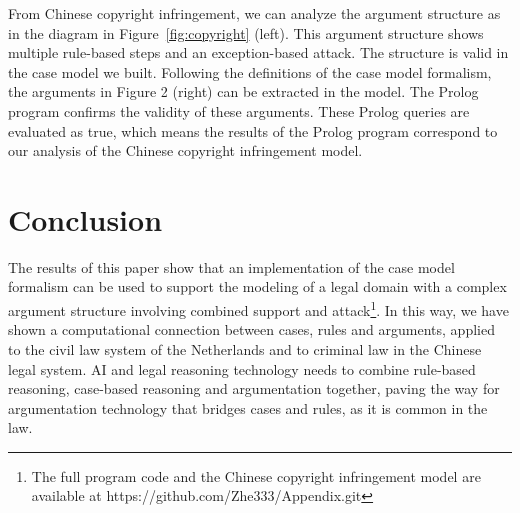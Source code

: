 \documentclass{IOS-Book-Article}
\begin{document}
\begin{figure*}[t]
	\scalebox{0.6}{}
\caption{The Chinese copyright infringement model: argument structure (left); in Prolog (right)}
\label{fig:copyright}
\end{figure*}


From Chinese copyright infringement, we can analyze the argument structure as in the diagram in Figure~\ref{fig:copyright} (left). This argument structure shows multiple rule-based steps and an exception-based attack. The structure is valid in the case model we built. Following the definitions of the case model formalism, the  arguments in Figure 2 (right) can be extracted in the model. The Prolog program confirms the validity of these arguments. These Prolog queries are evaluated as true, which means the results of the Prolog program correspond to our analysis of the Chinese copyright infringement model.

\section{Conclusion}

\noindent 
The results of this paper show that an implementation of the case model formalism can be used to support the modeling of a legal domain with a complex argument structure involving combined support and attack\footnote{The full program code and the Chinese copyright infringement model are available at https://github.com/Zhe333/Appendix.git}. In this way, we have shown a computational connection between cases, rules and arguments, applied to the civil law system of the Netherlands and to criminal law in the Chinese legal system. AI and legal reasoning technology needs to combine rule-based reasoning, case-based reasoning and argumentation together, paving the way for argumentation technology that bridges cases and rules, as it is common in the law.

\footnotesize


\end{document}
